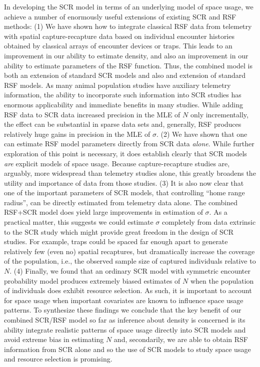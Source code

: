 \documentclass[12pt]{article}
\begin{document}
In developing the SCR model in terms of an underlying model of space
usage, we achieve a number of enormously useful extensions of existing
SCR and RSF methods:
(1) We have shown how to integrate classical RSF data from
telemetry with spatial capture-recapture data based on individual
encounter histories obtained by classical arrays of encounter devices
or traps. This leads to an improvement in our ability to estimate
density, and also an improvement in our ability to estimate parameters
of the RSF function.  Thus, the combined model is both an extension of
standard SCR models and also and extension of standard RSF models. As
many animal population studies have auxiliary telemetry information,
the ability to incorporate such information into SCR studies has
enormous applicability and immediate benefits in many studies.
While adding RSF data to SCR data increased precision in the MLE of $N$
only incrementally, the effect can be substantial in sparse data sets
and, generally, RSF produces
relatively huge gains in precision in the MLE of $\sigma$.
(2) We have shown that one can estimate RSF model parameters
directly from SCR data {\it alone}.
While further exploration of this point
is necessary,
it does establish clearly that SCR
models {\it are} explicit models of space usage. Because
capture-recapture studies are, arguably, more widespread than
telemetry studies alone, this greatly broadens the utility and
importance of data from those studies.
(3) It is also now clear
that one of the important parameters of SCR models, that controlling
``home range radius'', can be directly estimated from telemetry data
alone.
The combined RSF+SCR model does yield large improvements in estimation
of $\sigma$. As a practical matter, this suggests we could estimate
$\sigma$ completely from data extrinsic to the SCR study which might
provide great freedom in the design of SCR studies. For example, traps
could be spaced far enough apart to generate relatively few (even no) spatial recaptures,
but dramatically increase the coverage of the population, i.e., the
observed sample size of captured individuals relative to $N$.
(4) Finally, we found that an
ordinary SCR model with symmetric encounter probability model produces
extremely biased estimates of $N$ when the population of individuals
does exhibit resource selection.  As such, it is important to account
for space usage when important covariates are known to influence
space usage patterns.
To synthesize these findings we conclude that
the key benefit of our combined SCR/RSF model so far as inference about density is
concerned is its ability
integrate realistic patterns of space usage directly into SCR models
and avoid extreme bias in estimating $N$ and, secondarily, we are able
to obtain RSF information from SCR alone and so the use of SCR models
to study space usage and resource selection is promising.
\end{document}
